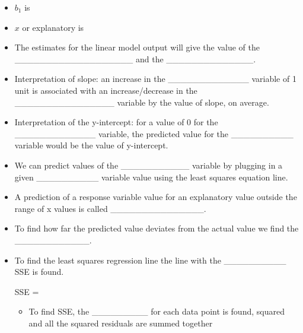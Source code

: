 \documentclass[
]{report}
\providecommand{\tightlist}{%
  \setlength{\itemsep}{0pt}\setlength{\parskip}{0pt}}
\begin{document}
\vspace{0.1in}

\begin{itemize}
\tightlist
\item
  \(b_1\) is
\end{itemize}

\vspace{0.1in}

\begin{itemize}
\tightlist
\item
  \(x\) or explanatory is
\end{itemize}

\vspace{0.1in}


\begin{itemize}
\item
  The estimates for the linear model output will give the value of the \_\_\_\_\_\_\_\_\_\_\_\_\_\_\_\_\_\_\_ and the \_\_\_\_\_\_\_\_\_\_\_\_\_\_.
\item
  Interpretation of slope: an increase in the \_\_\_\_\_\_\_\_\_\_\_\_\_ variable of 1 unit is associated with an increase/decrease in the \_\_\_\_\_\_\_\_\_\_\_\_\_\_\_\_ variable by the value of slope, on average.
\item
  Interpretation of the y-intercept: for a value of 0 for the \_\_\_\_\_\_\_\_\_\_\_\_\_ variable, the predicted value for the \_\_\_\_\_\_\_\_\_\_ variable would be the value of y-intercept.
\item
  We can predict values of the \_\_\_\_\_\_\_\_\_\_\_ variable by plugging in a given \_\_\_\_\_\_\_\_\_\_ variable value using the least squares equation line.
\item
  A prediction of a response variable value for an explanatory value outside the range of x values is called \_\_\_\_\_\_\_\_\_\_\_\_\_\_\_.
\item
  To find how far the predicted value deviates from the actual value we find the \_\_\_\_\_\_\_\_\_\_\_\_.
\end{itemize}

\vspace{0.3in}

\begin{itemize}
\item
  To find the least squares regression line the line with the \_\_\_\_\_\_\_\_\_\_ SSE is found.

  SSE =

  \begin{itemize}
  \tightlist
  \item
    To find SSE, the \_\_\_\_\_\_\_\_\_ for each data point is found, squared and all the squared residuals are summed together
  \end{itemize}
\end{itemize}
\end{document}

